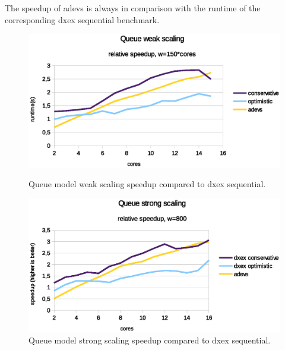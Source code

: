 The speedup of adevs is always in comparison with the runtime of the corresponding dxex sequential benchmark.
\begin{figure}
	\center
	
	\includegraphics[width=\modelfraction\columnwidth]{fig/queue_fixed_weak_speedup.eps}
	\caption{Queue model weak scaling speedup compared to dxex sequential.}
	\label{fig:Queue_plot_weak}
	
	\includegraphics[width=\modelfraction\columnwidth]{fig/queue_fixed_strong_speedup.eps}
	\caption{Queue model strong scaling speedup compared to dxex sequential.}
	\label{fig:Queue_plot_strong}
		
\end{figure}


